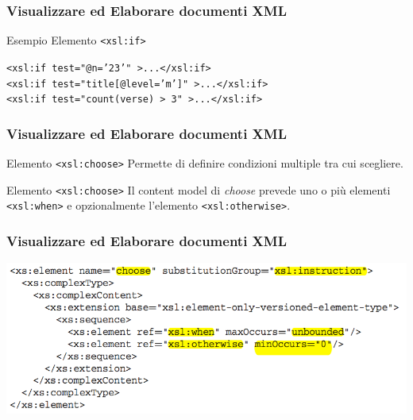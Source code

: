 \begin{frame}
    \frametitle{Visualizzare ed Elaborare documenti XML}
    \addtocounter{nframe}{1}
    

     \begin{block}{Esempio Elemento \texttt{<xsl:if>}}
        
        \texttt{<xsl:if test="@n='23'" >...</xsl:if>}
        \\\texttt{<xsl:if test="title[@level='m']" >...</xsl:if>}
        \\\texttt{<xsl:if test="count(verse) > 3" >...</xsl:if>}
        \\\texttt{}

     \end{block}

\end{frame}


\begin{frame}
    \frametitle{Visualizzare ed Elaborare documenti XML}
    \addtocounter{nframe}{1}
    

     \begin{block}{Elemento \texttt{<xsl:choose>}}
        Permette di definire condizioni multiple tra cui scegliere.
     \end{block}

     \begin{block}{Elemento \texttt{<xsl:choose>}}
        Il content model di \textit{choose} prevede uno o più elementi \texttt{<xsl:when>} e opzionalmente l'elemento \texttt{<xsl:otherwise>}.
     \end{block}

\end{frame}

\begin{frame}
    \frametitle{Visualizzare ed Elaborare documenti XML}
    \addtocounter{nframe}{1}
    
    \begin{center}
        \includegraphics[width=.9\textwidth]{imgs/Schema-choose.png}
    \end{center}

\end{frame}

